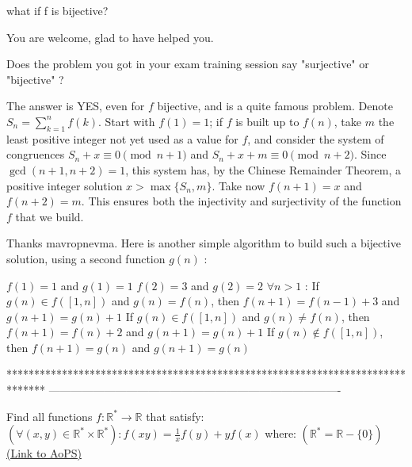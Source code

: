 \begin{solution}
	what if f is bijective?
\end{solution}



\begin{solution}
	You are welcome, glad to have helped you.

Does the problem you got in your exam \/ training session say "surjective" or "bijective" ?
\end{solution}



\begin{solution}
	The answer is YES, even for $f$ bijective, and is a quite famous problem. Denote $S_n = \sum_{k=1}^n f(k)$. Start with $f(1) = 1$; if $f$ is built up to $f(n)$, take $m$ the least positive integer not yet used as a value for $f$, and consider the system of congruences $S_n + x \equiv 0 \pmod{n+1}$ and $S_n + x + m \equiv 0 \pmod{n+2}$. Since $\gcd(n+1,n+2) = 1$, this system has, by the Chinese Remainder Theorem, a positive integer solution $x > \max\{S_n,m\}$. Take now $f(n+1) = x$ and $f(n+2) = m$. This ensures both the injectivity and surjectivity of the function $f$ that we build.
\end{solution}



\begin{solution}
	Thanks mavropnevma.
Here is another simple algorithm to build such a bijective solution, using a second function $g(n)$  :

$f(1)=1$ and $g(1)=1$
$f(2)=3$ and $g(2)=2$
$\forall n>1$ :
If $g(n)\in f([1,n])$ and $g(n)=f(n)$, then $f(n+1)=f(n-1)+3$ and $g(n+1)=g(n)+1$
If $g(n)\in f([1,n])$ and $g(n)\ne f(n)$, then $f(n+1)=f(n)+2$ and $g(n+1)=g(n)+1$
If $g(n)\not\in f([1,n])$, then $f(n+1)=g(n)$ and $g(n+1)=g(n)$
\end{solution}
*******************************************************************************
-------------------------------------------------------------------------------

\begin{problem}
	Find all functions $f:\mathbb{R}^{*}\to\mathbb{R}$  that satisfy: 
$\left(\forall  (x,y) \in \mathbb{R}^{*}\times\mathbb{R}^{*}\right)  :f(xy)=\frac{1}{x}f(y)+yf(x)$
where: $\left(\mathbb{R}^{*}=\mathbb{R}-\{0\}\right)$
	\flushright \href{https://artofproblemsolving.com/community/c6h480461}{(Link to AoPS)}
\end{problem}




